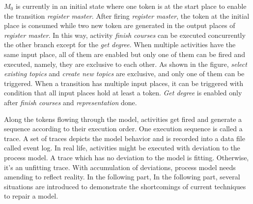 $M_0$ is currently in an initial state where one token is at the start place to enable the transition \emph{register master}. After firing \emph{register master}, the token at the initial place is consumed while two new token are generated in the output places of \emph{register master}. In this way, activity \emph{finish courses}  can be executed concurrently the other branch except for the \emph{get degree}. When multiple activities have the same input place, all of them are enabled but only one of them can be fired and executed, namely, they are exclusive to each other. As shown in the figure,  \emph{select existing topics}  and \emph{create new topics} are exclusive, and only one of them can be triggered. When a transition has multiple input places, it can be triggered with condition that all input places hold at least a token. \emph{Get degree} is enabled only after \emph{finish courses} and \emph{representation} done. 


Along the tokens flowing through the model, activities get fired and generate a sequence according to their execution order. One execution sequence is called a trace. A set of traces depicts the model behavior and is recorded into a data file called event log. In real life, activities might be executed with deviation to the process model. A trace which has no deviation to the model is fitting. Otherwise, it's an unfitting trace. With accumulation of deviations, process model needs amending to reflect reality.  In the following part, In the following part,
several situations are introduced to demonstrate the shortcomings of current techniques
to repair a model.

